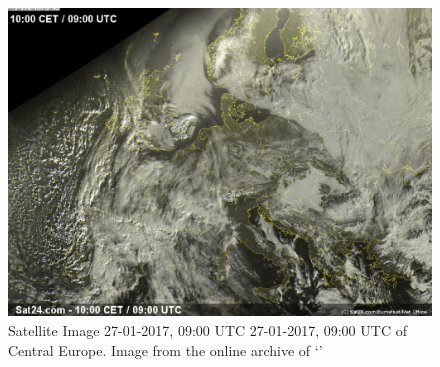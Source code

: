 \begin{figure}[h]
    \centering
    \includegraphics[width=\textwidth]{graphics/sat.eps}
    \caption[Satellite Image 27-01-2017, 09:00 UTC ]{Satellite Image 27-01-2017, 09:00 UTC 27-01-2017, 09:00 UTC of Central Europe. Image from the online archive of `\citeauthor{sat24}' \cite{sat24}}
    \label{fig:Satfoto}
\end{figure}

\FloatBarrier
